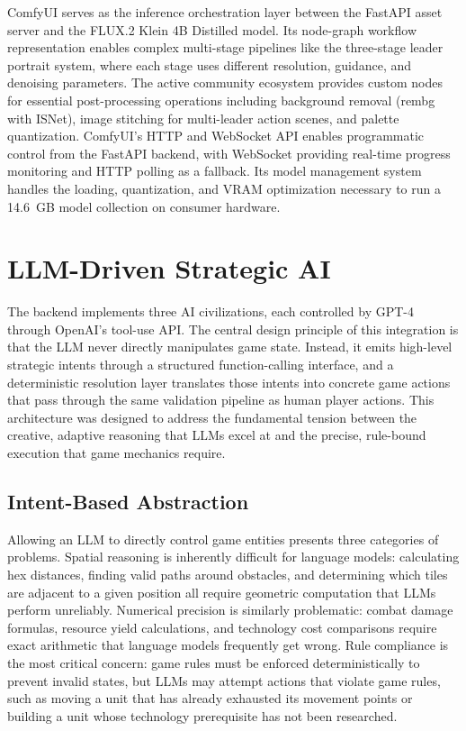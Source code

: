 \documentclass[conference]{IEEEtran}
\begin{document}
ComfyUI serves as the inference orchestration layer between the FastAPI asset server and the FLUX.2 Klein 4B Distilled model. Its node-graph workflow representation enables complex multi-stage pipelines like the three-stage leader portrait system, where each stage uses different resolution, guidance, and denoising parameters. The active community ecosystem provides custom nodes for essential post-processing operations including background removal (rembg with ISNet), image stitching for multi-leader action scenes, and palette quantization. ComfyUI's HTTP and WebSocket API enables programmatic control from the FastAPI backend, with WebSocket providing real-time progress monitoring and HTTP polling as a fallback. Its model management system handles the loading, quantization, and VRAM optimization necessary to run a 14.6~GB model collection on consumer hardware.

\section{LLM-Driven Strategic AI}
\label{sec:llm}

The backend implements three AI civilizations, each controlled by GPT-4 through OpenAI's tool-use API. The central design principle of this integration is that the LLM never directly manipulates game state. Instead, it emits high-level strategic intents through a structured function-calling interface, and a deterministic resolution layer translates those intents into concrete game actions that pass through the same validation pipeline as human player actions. This architecture was designed to address the fundamental tension between the creative, adaptive reasoning that LLMs excel at and the precise, rule-bound execution that game mechanics require.

\subsection{Intent-Based Abstraction}

Allowing an LLM to directly control game entities presents three categories of problems. Spatial reasoning is inherently difficult for language models: calculating hex distances, finding valid paths around obstacles, and determining which tiles are adjacent to a given position all require geometric computation that LLMs perform unreliably. Numerical precision is similarly problematic: combat damage formulas, resource yield calculations, and technology cost comparisons require exact arithmetic that language models frequently get wrong. Rule compliance is the most critical concern: game rules must be enforced deterministically to prevent invalid states, but LLMs may attempt actions that violate game rules, such as moving a unit that has already exhausted its movement points or building a unit whose technology prerequisite has not been researched.
\end{document}
